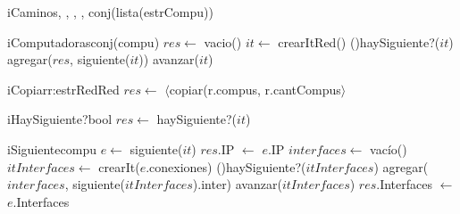 \begin{Algoritmos}
  \begin{algoritmo}{iCaminos}{, , , , }{conj(lista(estrCompu))}{}
  \end{algoritmo}
  
  \begin{algoritmo}{iComputadoras}{}{conj(compu)}{}
    $res \gets$ vacio()
     $it \gets$ crearItRed()
    \While(){haySiguiente?($it$)}{
      agregar($res$, siguiente($it$))
      avanzar($it$)
    }
  \end{algoritmo}
   
   \begin{algoritmo}{iCopiar}{\In r:estrRed}{Red}
   	$res \gets$ $\langle$copiar(r.compus, r.cantCompus$\rangle$
   \end{algoritmo}



  \begin{algoritmo}{iHaySiguiente?}{}{bool}{}
  $res \gets$ haySiguiente?($it$)
  \end{algoritmo}

  \begin{algoritmo}{iSiguiente}{}{compu}{}
     $e \gets$ siguiente($it$)
    $res$.IP $\gets$ $e$.IP
     $interfaces \gets$ vac\'{i}o()
     $itInterfaces \gets$ crearIt($e$.conexiones)
    \While(){haySiguiente?($itInterfaces$)}{
      agregar($interfaces$, siguiente($itInterfaces$).inter)
      avanzar($itInterfaces$)
    }
    $res$.Interfaces $\gets$ $e$.Interfaces
  \end{algoritmo}
    

\end{Algoritmos}
